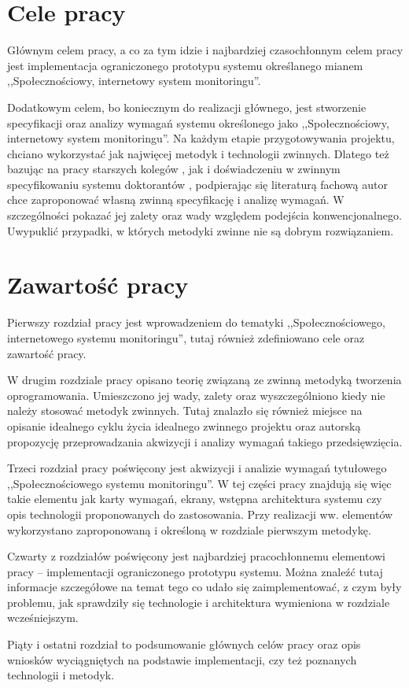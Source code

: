 \newpage

\section{Cele pracy}
\label{sec:celePracy}

Głównym celem pracy, a co za tym idzie i najbardziej czasochłonnym celem pracy jest implementacja ograniczonego prototypu systemu określanego mianem ,,Społecznościowy, internetowy system monitoringu''.

Dodatkowym celem, bo koniecznym do realizacji głównego, jest stworzenie specyfikacji oraz analizy wymagań systemu określonego jako ,,Społecznościowy, internetowy system monitoringu''. Na każdym etapie przygotowywania projektu, chciano wykorzystać jak najwięcej metodyk i technologii zwinnych. Dlatego też bazując na pracy starszych kolegów \cite{JakMich06}, jak i doświadczeniu w zwinnym specyfikowaniu systemu doktorantów \cite{Mad09}, podpierając się literaturą fachową \cite{Bec99} autor chce zaproponować własną zwinną specyfikację i analizę wymagań. W szczególności pokazać jej zalety oraz wady względem podejścia konwencjonalnego. Uwypuklić przypadki, w których metodyki zwinne nie są dobrym rozwiązaniem.

\section{Zawartość pracy}
\label{sec:zawartoscPracy}

Pierwszy rozdział pracy jest wprowadzeniem do tematyki ,,Społecznościowego, internetowego systemu monitoringu'', tutaj również zdefiniowano cele oraz zawartość pracy.

W drugim rozdziale pracy opisano teorię związaną ze zwinną metodyką tworzenia oprogramowania. Umieszczono jej wady, zalety oraz wyszczególniono kiedy nie należy stosować metodyk zwinnych. Tutaj znalazło się również miejsce na opisanie idealnego cyklu życia idealnego zwinnego projektu oraz autorską propozycję przeprowadzania akwizycji i analizy wymagań takiego przedsięwzięcia.

Trzeci rozdział pracy poświęcony jest akwizycji i analizie wymagań tytułowego ,,Społecznościowego systemu monitoringu''. W tej części pracy znajdują się więc takie elementu jak karty wymagań, ekrany, wstępna architektura systemu czy opis technologii proponowanych do zastosowania. Przy realizacji ww. elementów wykorzystano zaproponowaną i określoną w rozdziale pierwszym metodykę.

Czwarty z rozdziałów poświęcony jest najbardziej pracochłonnemu elementowi pracy -- implementacji ograniczonego prototypu systemu. Można znaleźć tutaj informacje szczegółowe na temat tego co udało się zaimplementować, z czym były problemu, jak sprawdziły się technologie i architektura wymieniona w rozdziale wcześniejszym.

Piąty i ostatni rozdział to podsumowanie głównych celów pracy oraz opis wniosków wyciągniętych na podstawie implementacji, czy też poznanych technologii i metodyk.

\newpage
